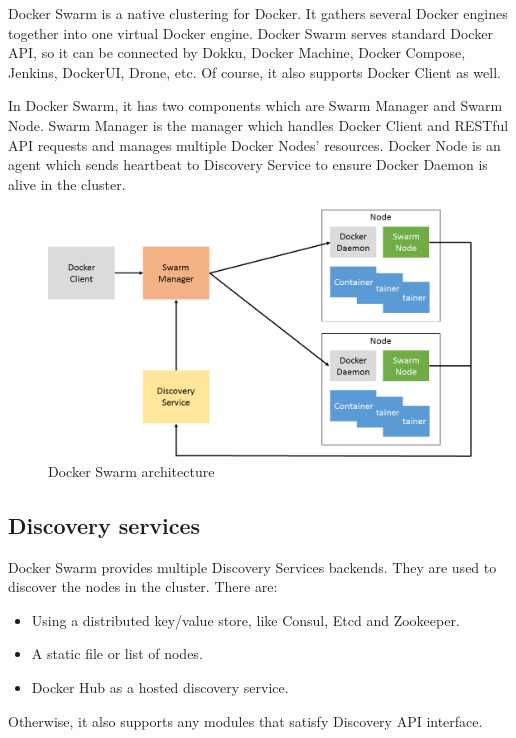 Docker Swarm \cite{DockerSwarm} is a native clustering for Docker. It gathers several Docker engines together into one virtual Docker engine. Docker Swarm serves standard Docker API, so it can be connected by Dokku, Docker Machine, Docker Compose, Jenkins, DockerUI, Drone, etc. Of course, it also supports Docker Client as well.

In Docker Swarm, it has two components which are Swarm Manager and Swarm Node. Swarm Manager is the manager which handles Docker Client and RESTful API requests and manages multiple Docker Nodes' resources. Docker Node is an agent which sends heartbeat to Discovery Service to ensure Docker Daemon is alive in the cluster.

\begin{figure}[h]
\begin{center}
\includegraphics[width=15cm]{figure/swarm_docker.png}
\end{center}
\caption{Docker Swarm architecture}
\end{figure}

\subsection{Discovery services}
Docker Swarm provides multiple Discovery Services backends. They are used to discover the nodes in the cluster. There are:
\begin{itemize}
    \item Using a distributed key/value store, like Consul, Etcd and Zookeeper.
    \item A static file or list of nodes.
    \item Docker Hub as a hosted discovery service.
\end{itemize}
Otherwise, it also supports any modules that satisfy Discovery API interface.

